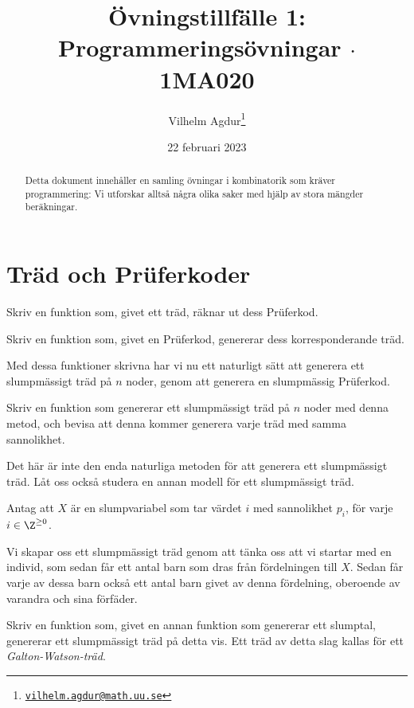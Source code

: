 \documentclass[nobib]{tufte-handout}
\title{Övningstillfälle 1: Programmeringsövningar $\cdot$ 1MA020}
\author[Vilhelm Agdur]{Vilhelm Agdur\thanks{\href{mailto:vilhelm.agdur@math.uu.se}{\nolinkurl{vilhelm.agdur@math.uu.se}}}}
\date{22 februari 2023}
\begin{document}
\maketitle%

\begin{abstract}
\noindent
Detta dokument innehåller en samling övningar i kombinatorik som kräver programmering: Vi utforskar alltså några olika saker med hjälp av stora mängder beräkningar.
\end{abstract}

\section{Träd och Prüferkoder}

\begin{xca}
    Skriv en funktion som, givet ett träd, räknar ut dess Prüferkod.
\end{xca}

\begin{xca}
    Skriv en funktion som, givet en Prüferkod, genererar dess korresponderande träd.
\end{xca}

Med dessa funktioner skrivna har vi nu ett naturligt sätt att generera ett slumpmässigt träd på $n$ noder, genom att generera en slumpmässig Prüferkod.

\begin{xca}
    Skriv en funktion som genererar ett slumpmässigt träd på $n$ noder med denna metod, och bevisa att denna kommer generera varje träd med samma sannolikhet.
\end{xca}

Det här är inte den enda naturliga metoden för att generera ett slumpmässigt träd. Låt oss också studera en annan modell för ett slumpmässigt träd.

\begin{xca}
    Antag att $X$ är en slumpvariabel som tar värdet $i$ med sannolikhet $p_i$, för varje $i \in \Z^{\geq 0}$.

    Vi skapar oss ett slumpmässigt träd genom att tänka oss att vi startar med en individ, som sedan får ett antal barn som dras från fördelningen till $X$. Sedan får varje av dessa barn också ett antal barn givet av denna fördelning, oberoende av varandra och sina förfäder.

    Skriv en funktion som, givet en annan funktion som genererar ett slumptal, genererar ett slumpmässigt träd på detta vis. Ett träd av detta slag kallas för ett \emph{Galton-Watson-träd}.
\end{xca}
\end{document}
